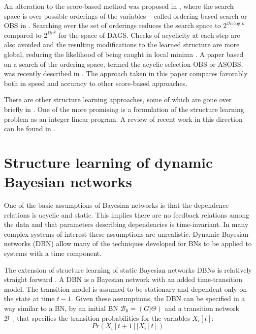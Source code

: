     An alteration to the score-based method was 
    proposed in \cite{Teyssier2012}, where the search space 
    is over possible orderings of the variables -- called ordering based
    search or OBS in \cite{NIPS2015_5803}. 
    Searching over the set of orderings reduces the search space to 
    $2^{\mathcal{O} n \log n}$ 
    compared to $2^{\Omega n^2}$ for the space of DAGS. 
    Checks of acyclicity at each step are also 
     avoided and the resulting modifications to the 
     learned structure are more global, reducing
    the likelihood of being caught in local minima \cite{Teyssier2012}.
    A paper based on a search of the ordering space, termed 
    the acyclic selection OBS or ASOBS, was recently described
    in \cite{NIPS2015_5803}. The approach taken in this paper
    compares favorably both in speed and accuracy to other score-based
    approaches. 

    There are other structure learning approaches, some 
    of which are gone over briefly in \cite{Zhou2007}. One 
    of the more promising is a formulation of the structure
    learning problem as an integer linear program. A review
    of recent work in this direction can be found in \cite{Cussens2013}. 


    \section{Structure learning of dynamic Bayesian networks}
  

    One of the basic assumptions of Bayesian networks is 
    that the dependence relations is acyclic and static.
    This implies
    there are no feedback relations among the data and
    that parameters describing dependencies is time-invariant. 
    In many complex systems of interest these assumptions
    are unrealistic. Dynamic Bayesian networks (DBN) allow
    many of the techniques developed for BNs to be 
    applied to systems with a time component. 

    The extension of structure learning of static Bayesian  
    networks DBNs is relatively straight forward \cite{Friedman1998}.
    A DBN is a Bayesian 
    network with an added time-transition model. The 
    transition model is assumed to be stationary and 
    dependent only on the state at time $t-1$. Given these
    assumptions, the DBN can be specified in a way similar
    to a BN, by an initial BN $\mathcal{B_0} = (G | \Theta)$
    and a transition network $\mathcal{B}_{\rightarrow}$ that
    specifies the transition probabilities for the 
    variables $X_i[t]$: 
    \[
        Pr(X_i[t+1]|X_i[t])     
    \]

